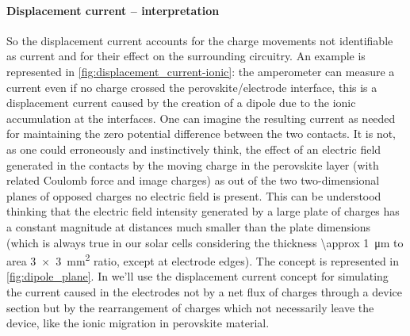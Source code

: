 		\paragraph{Displacement current -- interpretation} So the displacement current accounts for the charge movements not identifiable as current and for their effect on the surrounding circuitry.
		An example is represented in \cref{fig:displacement_current-ionic}: the amperometer can measure a current even if no charge crossed the perovskite/electrode interface, this is a displacement current caused by the creation of a dipole due to the ionic accumulation at the interfaces.
		One can imagine the resulting current as needed for maintaining the zero potential difference between the two contacts.
		It is not, as one could erroneously and instinctively think, the effect of an electric field generated in the contacts by the moving charge in the perovskite layer (with related Coulomb force and image charges) as out of the two two-dimensional planes of opposed charges no electric field is present.
		This can be understood thinking that the electric field intensity generated by a large plate of charges has a constant magnitude at distances much smaller than the plate dimensions (which is always true in our solar cells considering the thickness \SI{\approx 1}{\um} to area \SI{3x3}{\square\mm} ratio, except at electrode edges).
		The concept is represented in \cref{fig:dipole_plane}.
		In  we'll use the displacement current concept for simulating the current caused in the electrodes not by a net flux of charges through a device section but by the rearrangement of charges which not necessarily leave the device, like the ionic migration in perovskite material.
		
		\begin{figure}
		\end{figure}
		

